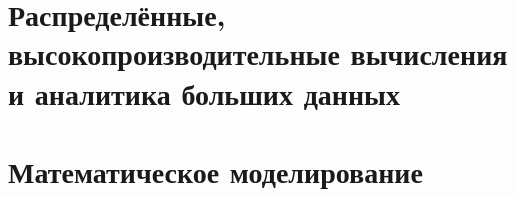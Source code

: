 %



\pagestyle{empty}
\cleardoublepage
{}
{}

\part[Distributed, high-performance computing technologies and big
data analytics]{Распределённые, высокопроизводительные вычисления и
  аналитика больших данных} 
\cleardoublepage


\pagestyle{empty}
\cleardoublepage
{}
{}
\part[Mathematical modeling]{Математическое моделирование}
\cleardoublepage


% 



%



\clearpage
{} \label{indexsec}
\def\leftmark{Авторский указатель}
\def\rightmark{Авторский указатель}
\def\indexname{Авторский указатель}
{
\def\authorindexname{Авторский указатель}
\printindex[author]
}
\clearpage
{} \label{indexaltauthor}
\def\leftmark{Author index}
\def\rightmark{Author index}
{
\printindex[altauthor]
}

